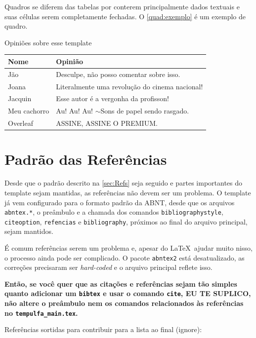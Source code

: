 Quadros se diferem das tabelas por conterem principalmente dados textuais e suas células serem completamente fechadas. O \autoref{quad:exemplo} é um exemplo de quadro.

\begin{quadro}[h]
\centering
\caption{Opiniões sobre esse template}\label{quad:exemplo}
  \begin{tabular}{|l|p{9cm}|}
    \hline 
    \rowcolor[gray]{.9}
    \bf Nome& \bf Opinião\\
    \hline
    Jão& Desculpe, não posso comentar sobre isso.\\
    \hline
    Joana& Literalmente uma revolução do cinema nacional!\\
    \hline
    Jacquin& Esse autor é a vergonha da profisson!\\
    \hline
    Meu cachorro& Au! Au! Au! $\sim$Sons de papel sendo rasgado.\\
    \hline
    Overleaf& ASSINE, ASSINE O PREMIUM.\\
    \hline
    \end{tabular}
    
    \vspace{0.3cm}
\end{quadro}


\section{Padrão das Referências}

Desde que o padrão descrito na \autoref{sec:Refs} seja seguido e partes importantes do template sejam mantidas, as referências não devem ser um problema. O template já vem configurado para o formato padrão da ABNT, desde que os arquivos \texttt{abntex.*}, o preâmbulo e a chamada dos comandos \texttt{bibliographystyle}, \texttt{citeoption}, \texttt{refencias} e \texttt{bibliography}, próximos ao final do arquivo principal, sejam mantidos.

É comum referências serem um problema e, apesar do \LaTeX\ ajudar muito nisso, o processo ainda pode ser complicado. O pacote \texttt{abntex2} está desatualizado, as correções precisaram ser \emph{hard-coded} e o arquivo principal reflete isso.

\textbf{Então, se você quer que as citações e referências sejam tão simples quanto adicionar um \texttt{bibtex} e usar o comando \texttt{cite}, EU TE SUPLICO, não altere o preâmbulo nem os comandos relacionados às referências no \texttt{tempulfa\_main.tex}.}

Referências sortidas para contribuir para a lista ao final (ignore): \cite{Eco1996,Booth2000,BIB2010,Hexsel2004,Franca2001,Gil2002,Porto2002,Silva2005,UFLA:2015,Moura1998,NBR6023:2002,LeGuin:1987}

